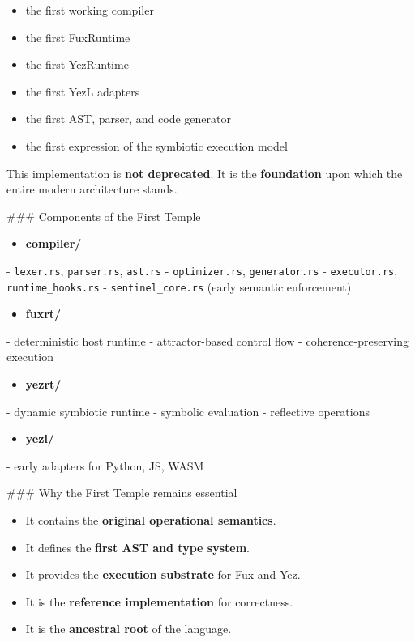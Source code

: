 \documentclass[12pt, a4paper]{book}
\begin{document}
\begin{itemize}
  \item the first working compiler  
  \item the first FuxRuntime  
  \item the first YezRuntime  
  \item the first YezL adapters  
  \item the first AST, parser, and code generator  
  \item the first expression of the symbiotic execution model  
\end{itemize}

This implementation is \textbf{not deprecated}. It is the \textbf{foundation} upon which the entire modern architecture stands.

\#\#\# Components of the First Temple  
\begin{itemize}
  \item \textbf{compiler/}  
\end{itemize}
  - \texttt{lexer.rs}, \texttt{parser.rs}, \texttt{ast.rs}  
  - \texttt{optimizer.rs}, \texttt{generator.rs}  
  - \texttt{executor.rs}, \texttt{runtime\_hooks.rs}  
  - \texttt{sentinel\_core.rs} (early semantic enforcement)  

\begin{itemize}
  \item \textbf{fuxrt/}  
\end{itemize}
  - deterministic host runtime  
  - attractor-based control flow  
  - coherence-preserving execution  

\begin{itemize}
  \item \textbf{yezrt/}  
\end{itemize}
  - dynamic symbiotic runtime  
  - symbolic evaluation  
  - reflective operations  

\begin{itemize}
  \item \textbf{yezl/}  
\end{itemize}
  - early adapters for Python, JS, WASM  

\#\#\# Why the First Temple remains essential  
\begin{itemize}
  \item It contains the \textbf{original operational semantics}.  
  \item It defines the \textbf{first AST and type system}.  
  \item It provides the \textbf{execution substrate} for Fux and Yez.  
  \item It is the \textbf{reference implementation} for correctness.  
  \item It is the \textbf{ancestral root} of the language.  
\end{itemize}
\end{document}
